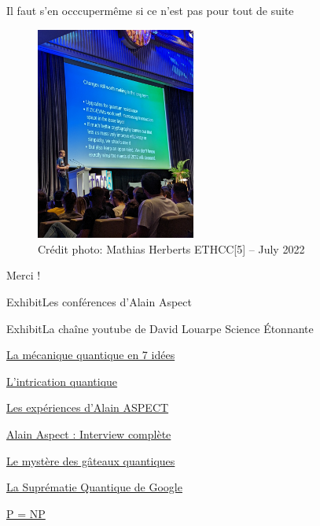 \documentclass{beamer}
\begin{document}
\begin{frame}{Il faut s'en occcuper}{m\^eme si ce n'est pas pour tout de suite}
  \begin{center}
    \begin{figure}
      \includegraphics[height=7cm]{eth.jpg}
      \caption*{Cr\'edit photo: Mathias Herberts ETHCC[5] -- July 2022}
    \end{figure}
  \end{center}
\end{frame}

\begin{frame}
        Merci !
\end{frame}

\begin{frame}{Exhibit}{Les conf\'erences d'Alain Aspect}

\end{frame}

\begin{frame}{Exhibit}{La cha\^ine youtube de David Louarpe Science \'Etonnante}
  \begin{description}
  \item \href{https://www.youtube.com/watch?v=Rj3jTw2DxXQ&t=3s}{La mécanique quantique en 7 idées}
  \item \href{https://www.youtube.com/watch?v=5R6k2mEacZo&t=8s}{L'intrication quantique}
  \item \href{https://www.youtube.com/watch?v=hB1kmGzpIrw}{Les expériences d'Alain ASPECT}
  \item \href{https://www.youtube.com/watch?v=OeZ_63iKPho&t=556s}{Alain Aspect : Interview complète}
  \item \href{https://www.youtube.com/watch?v=hB1kmGzpIrw}{Le mystère des gâteaux quantiques}
  \item \href{https://www.youtube.com/watch?v=KaRd_eB2qOA}{La Suprématie Quantique de Google}
  \item \href{https://www.youtube.com/watch?v=AgtOCNCejQ8}{P = NP}
  \end{description}
\end{frame}
\end{document}
